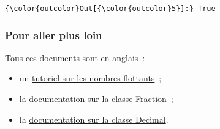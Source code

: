\begin{Verbatim}[commandchars=\\\{\}]
{\color{outcolor}Out[{\color{outcolor}5}]:} True
\end{Verbatim}
            
    \hypertarget{pour-aller-plus-loin}{%
\subsubsection{Pour aller plus loin}\label{pour-aller-plus-loin}}

    Tous ces documents sont en anglais~:

\begin{itemize}
\tightlist
\item
  un
  \href{https://docs.python.org/3/tutorial/floatingpoint.html}{tutoriel
  sur les nombres flottants}~;
\item
  la
  \href{https://docs.python.org/3/library/fractions.html}{documentation
  sur la classe Fraction}~;
\item
  la \href{https://docs.python.org/3/library/decimal.html}{documentation
  sur la classe Decimal}.
\end{itemize}